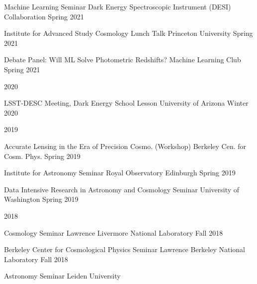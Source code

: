 \documentclass[11pt,letterpaper]{article}
\begin{document}
\begin{list}{}{\malzlist}
\begin{list}{}{\malzlist}
			{Machine Learning Seminar}
			{Dark Energy Spectroscopic Instrument (DESI) Collaboration}
			{Spring 2021}
		\item {}
			{Institute for Advanced Study Cosmology Lunch Talk}
			{Princeton University}
			{Spring 2021}
		\item {}
			{Debate Panel: Will ML Solve Photometric Redshifts?}
			{Machine Learning Club}
			{Spring 2021}
	\end{list}
	\item 2020
	\nopagebreak\begin{list}{}{\malzlist}
		\item {}
			{LSST-DESC Meeting, Dark Energy School Lesson}
			{University of Arizona}
			{Winter 2020}
	\end{list}
	\item 2019
	\nopagebreak\begin{list}{}{\malzlist}
		\item {}
		  {Accurate Lensing in the Era of Precision Cosmo. (Workshop)}
			{Berkeley Cen. for Cosm. Phys.}
			{Spring 2019}
		\item {}
		  {Institute for Astronomy Seminar}
			{Royal Observatory Edinburgh}
			{Spring 2019}
		\item {}
		  {Data Intensive Research in Astronomy and Cosmology Seminar}
			{University of Washington}
			{Spring 2019}
	\end{list}
	\item 2018
	\nopagebreak\begin{list}{}{\malzlist}
		\item {}
		  {Cosmology Seminar}
			{Lawrence Livermore National Laboratory}
			{Fall 2018}
		\item {}
		  {Berkeley Center for Cosmological Physics Seminar}
			{Lawrence Berkeley National Laboratory}
			{Fall 2018}
		\item {}
		  {Astronomy Seminar}
			{Leiden University}

\end{list}
\end{list}
\end{document}
